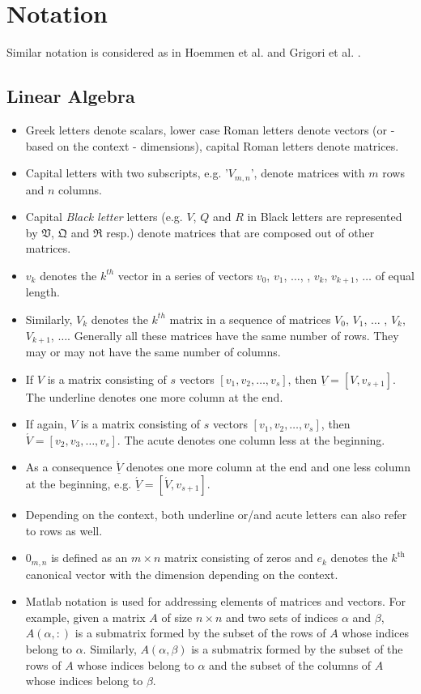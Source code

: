 \documentclass{scrartcl}
\numberwithin{equation}{section}
\begin{document}
\pagebreak

\tableofcontents

\pagebreak

\section{Notation}
Similar notation is considered as in Hoemmen et al. \cite{Hoemmen:2010:CKS:1970638} and Grigori et al. \cite{Grigori}.
\subsection*{Linear Algebra}
\begin{itemize}
\item Greek letters denote scalars, lower case Roman letters denote vectors (or - based on the context - dimensions), capital Roman letters denote matrices.
\item Capital letters with two subscripts, e.g. '$V_{m, n}$', denote matrices with $m$ rows and $n$ columns.
\item Capital \textit{Black letter} letters (e.g. $V$, $Q$ and $R$ in Black letters are represented by $\mathfrak{V}$, $\mathfrak{Q}$ and $\mathfrak{R}$ resp.) denote matrices that are composed out of other matrices. 
\item $v_k$ denotes the $k^{th}$ vector in a series of vectors $v_0$, $v_1$, $\ldots$, ,  $v_k$, $v_{k+1}$, $\ldots$ of equal length.
\item Similarly, $V_k$ denotes the $k^{th}$ matrix in a sequence of matrices $V_0$, $V_1$, $\ldots$ , $V_k$, $V_{k+1}$, $\ldots$. Generally all these matrices have the same number of rows. They may or may not have the same number of columns.
\item If $V$ is a matrix consisting of $s$ vectors $\left[v_1, v_2, \ldots, v_s\right]$, then $\underline{V} = \left[V, v_{s+1} \right]$. The underline denotes one more column at the end.
\item If again, $V$ is a matrix consisting of $s$ vectors $\left[v_1, v_2, \ldots, v_s\right]$, then $\acute{V} = [v_2, v_3, \ldots, v_s]$. The acute denotes one column less at the beginning.
\item As a consequence $\underline{\acute{V}}$ denotes one more column at the end and one less column at the beginning, e.g. $\underline{\acute{V}} = [\acute{V}, v_{s+1}]$.
\item Depending on the context, both underline or/and acute letters can also refer to rows as well. 
\item $0_{m, n}$ is defined as an $m \times n$ matrix consisting of zeros and $e_k$ denotes the $k^{\text{th}}$ canonical vector with the dimension depending on the context.
\item Matlab notation is used for addressing elements of matrices and vectors. For example, given a matrix $A$ of size $n \times n$ and two sets of indices $\alpha$ and $\beta$, $A(\alpha,:)$ is a submatrix formed by the subset of the rows of $A$ whose indices belong to $\alpha$. Similarly, $A(\alpha, \beta)$ is a submatrix formed by the subset of the rows of $A$ whose indices belong to $\alpha$ and the subset of the columns of $A$ whose indices belong to $\beta$.
\end{itemize}
\end{document}
